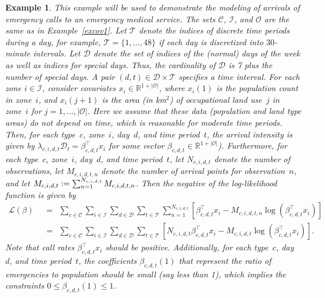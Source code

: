 \documentclass[article]{jss}
\newtheorem{example}{Example}[section]
\def\defi{\vcentcolon=}
\begin{document}
\begin{example}
\label{excov2}
This example will be used to demonstrate the modeling of arrivals of emergency calls to an emergency medical service.
The sets $\mathcal{C}$, $\mathcal{I}$, and $\mathcal{O}$ are the same as in Example~\ref{excov1}.
Let $\mathcal{T}$ denote the indices of discrete time periods during a day, for example, $\mathcal{T} = \{1,\ldots,48\}$ if each day is discretized into $30$-minute intervals.
Let $\mathcal{D}$ denote the set of indices of the (normal) days of the week as well as indices for special days.
Thus, the cardinality of $\mathcal{D}$ is 7 plus the number of special days.
A pair $(d,t) \in \mathcal{D} \times \mathcal{T}$ specifies a time interval.
For each zone $i \in \mathcal{I}$, consider covariates $x_{i} \in \mathbb{R}^{1+|\mathcal{O}|}$, where $x_{i}(1)$ is the population count in zone~$i$, and $x_{i}(j+1)$ is the area (in km$^2$) of occupational land use~$j$ in zone~$i$ for $j=1,\ldots,|\mathcal{O}|$.
Here we assume that these data (population and land type areas) do not depend on time, which is reasonable for moderate time periods.
Then, for each type~$c$, zone~$i$, day~$d$, and time period~$t$, the arrival intensity is given by
$\lambda_{c,i,d,t} \mathcal{D}_{t} = \beta_{c,d,t}^{\top} x_{i}$ for some vector $\beta_{c,d,t} \in \mathbb{R}^{1+|\mathcal{O}|}$).
Furthermore, for each type~$c$, zone~$i$, day~$d$, and time period~$t$, let $N_{c,i,d,t}$ denote the number of observations, let $M_{c,i,d,t,n}$ denote the number of arrival points for observation~$n$, and let $M_{c,i,d,t} \defi \sum_{n=1}^{N_{c,i,d,t}} M_{c,i,d,t,n}$.
Then the negative of the log-likelihood function is given by
\begin{equation}
\label{eqn:covariateloglike}
\begin{array}{rl}
\mathscr{L}(\beta) \ \ & = \ \ \displaystyle \sum_{c \in \mathcal{C}} \sum_{i \in \mathcal{I}} \sum_{d \in \mathcal{D}} \sum_{t \in \mathcal{T}} \sum_{n = 1}^{N_{c,i,d,t}} \left[\beta_{c,d,t}^{\top} x_{i} - 
M_{c,i,d,t,n} \log(\beta_{c,d,t}^{\top} x_{i})\right] \\
& = \ \ \displaystyle \sum_{c \in \mathcal{C}} \sum_{i \in \mathcal{I}} \sum_{d \in \mathcal{D}} \sum_{t \in \mathcal{T}} \left[N_{c,i,d,t} \beta_{c,d,t}^{\top} x_{i} - M_{c,i,d,t} \log(\beta_{c,d,t}^{\top} x_{i})\right].
\end{array}
\end{equation}
Note that call rates $\beta_{c,d,t}^{\top} x_{i}$ should be positive.
Additionally, for each type~$c$, day~$d$, and time period~$t$, the coefficients $\beta_{c,d,t}(1)$ that represent the ratio of emergencies to population should be small (say less than 1), which implies the constraints $0 \leq \beta_{c,d,t}(1) \leq 1$.

\end{example}
\end{document}
